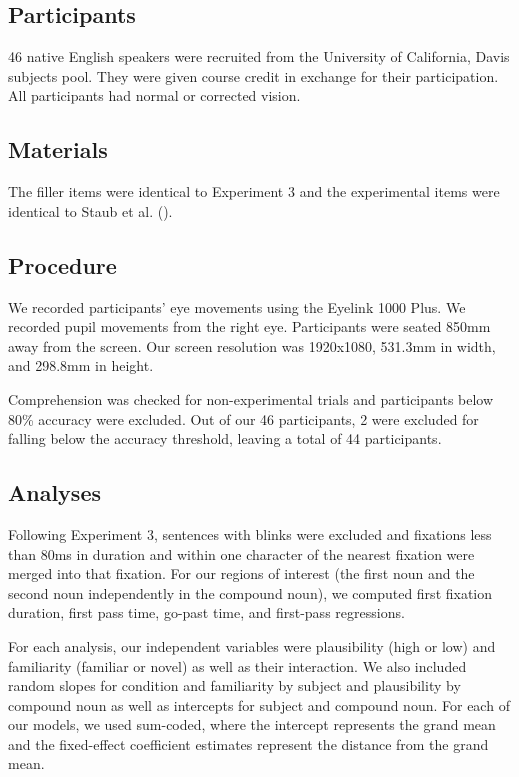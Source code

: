 \documentclass[
  letterpaper,
  DIV=11,
  numbers=noendperiod,
  nottoc]{scrreprt}
\begin{document}
\subsection{Participants}\label{participants-1}

46 native English speakers were recruited from the University of
California, Davis subjects pool. They were given course credit in
exchange for their participation. All participants had normal or
corrected vision.

\subsection{Materials}\label{materials-1}

The filler items were identical to Experiment 3 and the experimental
items were identical to Staub et al.
().

\subsection{Procedure}\label{procedure-1}

We recorded participants' eye movements using the Eyelink 1000 Plus. We
recorded pupil movements from the right eye. Participants were seated
850mm away from the screen. Our screen resolution was 1920x1080, 531.3mm
in width, and 298.8mm in height.

Comprehension was checked for non-experimental trials and participants
below 80\% accuracy were excluded. Out of our 46 participants, 2 were
excluded for falling below the accuracy threshold, leaving a total of 44
participants.

\subsection{Analyses}\label{analyses-1}

Following Experiment 3, sentences with blinks were excluded and
fixations less than 80ms in duration and within one character of the
nearest fixation were merged into that fixation. For our regions of
interest (the first noun and the second noun independently in the
compound noun), we computed first fixation duration, first pass time,
go-past time, and first-pass regressions.

For each analysis, our independent variables were plausibility (high or
low) and familiarity (familiar or novel) as well as their interaction.
We also included random slopes for condition and familiarity by subject
and plausibility by compound noun as well as intercepts for subject and
compound noun. For each of our models, we used sum-coded, where the
intercept represents the grand mean and the fixed-effect coefficient
estimates represent the distance from the grand mean.
\end{document}
